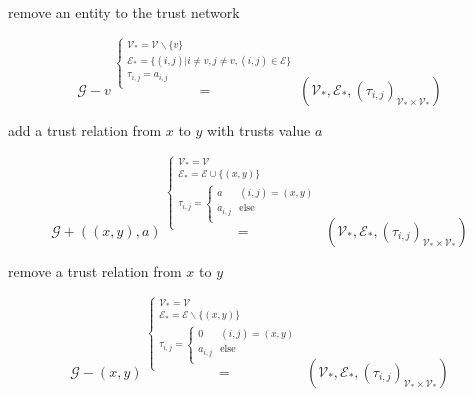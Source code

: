 \documentclass{article}
\begin{document}
remove an entity to the trust network

\begin{equation}
\mathcal{G}-v\overset{\left\{
\begin{array}{c}
 \mathcal{V}_*=\mathcal{V}\backslash \{v\} \\
 \mathcal{E}_*=\{(i,j)|i\neq v,j\neq v,(i,j)\in \mathcal{E}\} \\
 \tau _{i,j}=a_{i,j} \\
\end{array}
\right.}{=}\left(\mathcal{V}_*,\mathcal{E}_*,\left(\tau _{i,j}\right)_{\mathcal{V}_*\times \mathcal{V}_*}\right)
\end{equation}

add a trust relation from \(x\) to \(y\) with trusts value \(a\)

\begin{equation}
\mathcal{G}+((x,y),a)\overset{\left\{
\begin{array}{c}
 \mathcal{V}_*=\mathcal{V} \\
 \mathcal{E}_*=\mathcal{E}\cup \{(x,y)\} \\
 \tau _{i,j}=\left\{
\begin{array}{cc}
 a & (i,j)=(x,y) \\
 a_{i,j} & \text{else} \\
\end{array}
\right. \\
\end{array}
\right.}{=}\left(\mathcal{V}_*,\mathcal{E}_*,\left(\tau _{i,j}\right)_{\mathcal{V}_*\times \mathcal{V}_*}\right)
\end{equation}

remove a trust relation from \(x\) to \(y\)

\begin{equation}
\mathcal{G}-(x,y)\overset{\left\{
\begin{array}{c}
 \mathcal{V}_*=\mathcal{V} \\
 \mathcal{E}_*=\mathcal{E}\backslash \{(x,y)\} \\
 \tau _{i,j}=\left\{
\begin{array}{cc}
 0 & (i,j)=(x,y) \\
 a_{i,j} & \text{else} \\
\end{array}
\right. \\
\end{array}
\right.}{=}\left(\mathcal{V}_*,\mathcal{E}_*,\left(\tau _{i,j}\right)_{\mathcal{V}_*\times \mathcal{V}_*}\right)
\end{equation}
\end{document}
